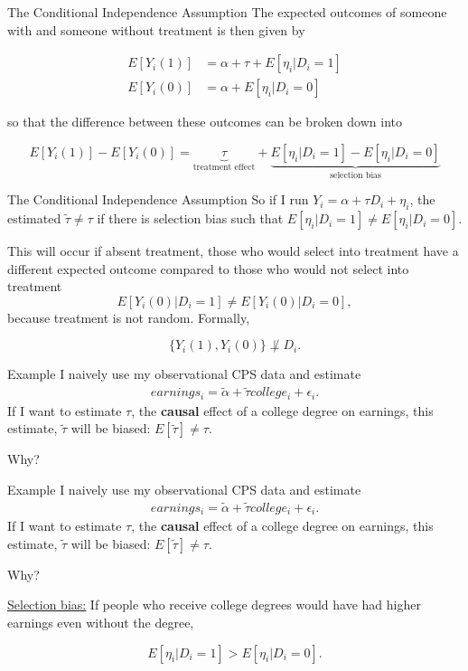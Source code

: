 \documentclass[
  ignorenonframetext,
]{beamer}
\begin{document}
\begin{frame}{The Conditional Independence Assumption}
\protect\hypertarget{the-conditional-independence-assumption-2}{}
The expected outcomes of someone with and someone without treatment is
then given by

\[
\begin{aligned}
E[Y_i(1)]&=\alpha+\tau+E[\eta_i|D_i=1]\\
E[Y_i(0)]&=\alpha+E[\eta_i|D_i=0]
\end{aligned}
\]

so that the difference between these outcomes can be broken down into

\[
 E[Y_i(1)]-E[Y_i(0)] = 
    \underbrace{\tau}_\text{treatment effect} + \underbrace{E[\eta_i|D_i=1]-E[\eta_i|D_i=0]}_\text{selection bias}
\]
\end{frame}

\begin{frame}{The Conditional Independence Assumption}
\protect\hypertarget{the-conditional-independence-assumption-3}{}
So if I run \(Y_i=\alpha+\tau D_i+\eta_i\), the estimated
\(\tilde{\tau}\neq \tau\) if there is selection bias such that
\(E[\eta_i|D_i=1]\neq E[\eta_i|D_i=0]\).

This will occur if absent treatment, those who would select into
treatment have a different expected outcome compared to those who would
not select into treatment \[
E[Y_i(0)|D_i=1]\neq E[Y_i(0)|D_i=0],
\] because treatment is not random. Formally,

\[
\{Y_i(1), Y_i(0)\} \not\perp  D_i.
\]
\end{frame}

\begin{frame}{Example}
\protect\hypertarget{example}{}
I naively use my observational CPS data and estimate \[
\begin{split}
earnings_i=\tilde{\alpha}+\tilde{\tau} college_i+\epsilon_i.
\end{split}
\] If I want to estimate \(\tau\), the \textbf{causal} effect of a
college degree on earnings, this estimate, \(\tilde{\tau}\) will be
biased: \(E[\tilde{\tau}]\neq \tau\).

Why?
\end{frame}

\begin{frame}{Example}
\protect\hypertarget{example-1}{}
I naively use my observational CPS data and estimate \[
\begin{split}
earnings_i=\tilde{\alpha}+\tilde{\tau} college_i+\epsilon_i.
\end{split}
\] If I want to estimate \(\tau\), the \textbf{causal} effect of a
college degree on earnings, this estimate, \(\tilde{\tau}\) will be
biased: \(E[\tilde{\tau}]\neq \tau\).

Why?

\underline{Selection bias:} If people who receive college degrees would
have had higher earnings even without the degree,

\[
E[\eta_i|D_i=1]>E[\eta_i|D_i=0].
\]
\end{frame}
\end{document}

